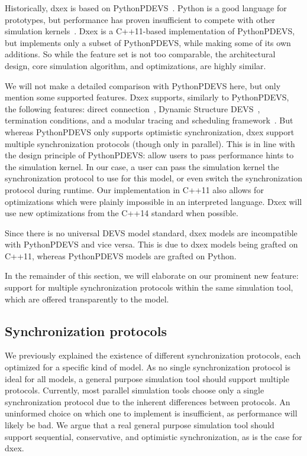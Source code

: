 \newcommand{\plotfraction}{0.85}
Historically, dxex is based on PythonPDEVS~\cite{PythonPDEVS}.
Python is a good language for prototypes, but performance has proven insufficient to compete with other simulation kernels~\cite{MasterThesis}.
Dxex is a C++11-based implementation of PythonPDEVS, but implements only a subset of PythonPDEVS, while making some of its own additions.
So while the feature set is not too comparable, the architectural design, core simulation algorithm, and optimizations, are highly similar.

We will not make a detailed comparison with PythonPDEVS here, but only mention some supported features.
Dxex supports, similarly to PythonPDEVS, the following features: direct connection~\cite{SymbolicFlattening}, \textsf{Dynamic Structure DEVS}~\cite{DSDEVS}, termination conditions, and a modular tracing and scheduling framework~\cite{PythonPDEVS}.
But whereas PythonPDEVS only supports optimistic synchronization, dxex support multiple synchronization protocols (though only in parallel).
This is in line with the design principle of PythonPDEVS: allow users to pass performance hints to the simulation kernel.
In our case, a user can pass the simulation kernel the synchronization protocol to use for this model, or even switch the synchronization protocol during runtime.
Our implementation in C++11 also allows for optimizations which were plainly impossible in an interpreted language. Dxex will use new optimizations from the C++14 standard when possible.

Since there is no universal \textsf{DEVS} model standard, dxex models are incompatible with PythonPDEVS and vice versa.
This is due to dxex models being grafted on C++11, whereas PythonPDEVS models are grafted on Python.

In the remainder of this section, we will elaborate on our prominent new feature: support for multiple synchronization protocols within the same simulation tool, which are offered transparently to the model.

\subsection{Synchronization protocols}
We previously explained the existence of different synchronization protocols, each optimized for a specific kind of model.
As no single synchronization protocol is ideal for all models, a general purpose simulation tool should support multiple protocols.
Currently, most parallel simulation tools choose only a single synchronization protocol due to the inherent differences between protocols.
An uninformed choice on which one to implement is insufficient, as performance will likely be bad.
We argue that a real general purpose simulation tool should support sequential, conservative, and optimistic synchronization, as is the case for dxex.

